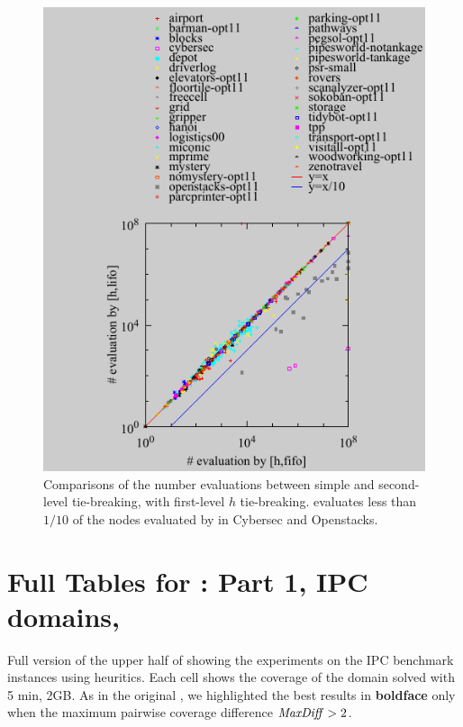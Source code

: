 \documentclass[10pt,letterpaper]{article}
\begin{document}
\begin{figure}[htb]
 \centering {}
 \includegraphics{tables/aaai16-30min-5min-cut/aaai16prelim3/evaluated-lmcut_ff-lmcut_lf.pdf}
 \caption{Comparisons of the number evaluations between simple \lifo and
 \fifo second-level tie-breaking, with first-level $h$
 tie-breaking. \lifo evaluates less than $1/10$ of the nodes evaluated
 by \fifo in Cybersec and Openstacks.}
 \label{f-h-eval-full}
\end{figure}

\clearpage
\onecolumn
\section{Full Tables for  : Part 1, IPC domains, \lmcut}

\begin{table}[htb]
 {
 \centering
 
 \caption{
 Full version of the upper half of  showing 
 the experiments on the IPC benchmark instances using \lmcut heuritics.
 Each cell shows the coverage of the domain solved with 5 min, 2GB.
 As in the original , we highlighted the best results in
 \textbf{boldface} only when the maximum pairwise coverage difference $\mit{MaxDiff}>2$.
 }
 \label{lmcut-ipc-full}
 }
\end{table}
\end{document}
